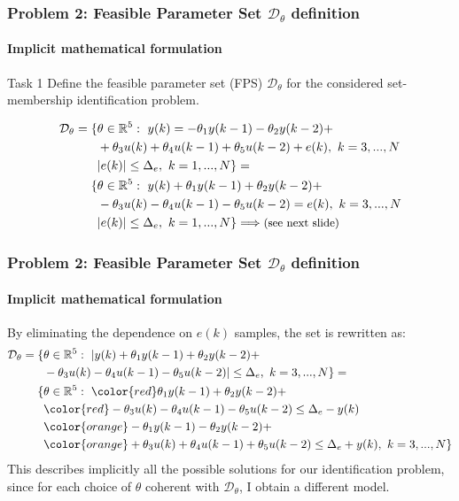 \documentclass{beamer}
\begin{document}
\begin{frame}
    \frametitle{Problem 2: Feasible Parameter Set $\mathcal{D}_\theta$ definition}
    \framesubtitle{Implicit mathematical formulation}
    
    \begin{alertblock}{Task 1}
        \justifying
        Define the feasible parameter set (FPS) $\mathcal{D}_\theta$ for the considered set-membership identification problem.
    \end{alertblock}
    \begin{equation}
        \begin{aligned}
            \mathcal{D}_\theta=
        \{
            &\theta\in\mathbb{R}^5: \ 
            y(k)=-\theta_1{y(k-1)}-\theta_2{y(k-2)}+\\
            &+\theta_3{u(k)}+\theta_4{u(k-1)}+\theta_5{u(k-2)} + e(k), \ k=3,...,N\\
            &\vert e(k) \vert \le \Delta_e, \ k=1,...,N
        \}=\\
        \{
            &\theta\in\mathbb{R}^5: \ 
            y(k)+\theta_1{y(k-1)}+\theta_2{y(k-2)}+\\
            &-\theta_3{u(k)}-\theta_4{u(k-1)}-\theta_5{u(k-2)}= e(k), \ k=3,...,N\\
            &\vert e(k) \vert \le \Delta_e, \ k=1,...,N
        \} \Longrightarrow \text{\small{(see next slide)}}
        \end{aligned}
    \end{equation}
\end{frame}

\begin{frame}
    \frametitle{Problem 2: Feasible Parameter Set $\mathcal{D}_\theta$ definition}
    \framesubtitle{Implicit mathematical formulation}
    By eliminating the dependence on $e(k)$ samples, the set is rewritten as: 
    \begin{equation}\label{eq:FPS}
        \begin{aligned}
           \mathcal{D}_\theta= \{
            &\theta\in\mathbb{R}^5: \ 
            \vert y(k)+\theta_1{y(k-1)}+\theta_2{y(k-2)}+\\
            &-\theta_3{u(k)}-\theta_4{u(k-1)}-\theta_5{u(k-2)}\vert \le \Delta_e, \ k=3,...,N
        \}=\\
        \{
            &\theta\in\mathbb{R}^5: \
            {\color{red}\theta_1{y(k-1)}+\theta_2{y(k-2)}+}\\
            &{\color{red}-\theta_3{u(k)}-\theta_4{u(k-1)}-\theta_5{u(k-2)} \le \Delta_e - y(k)}\\
            &{\color{orange}-\theta_1{y(k-1)}-\theta_2{y(k-2)}+}\\
            &{\color{orange}+\theta_3{u(k)}+\theta_4{u(k-1)}+\theta_5{u(k-2)} \le \Delta_e + y(k)}, \ k=3,...,N
        \}
        \end{aligned}
    \end{equation}
    This describes implicitly \alert{all the possible solutions} for our identification problem, since for each choice of $\theta$ coherent with $\mathcal{D}_\theta$, I obtain a different model.
\end{frame} 
\end{document}
